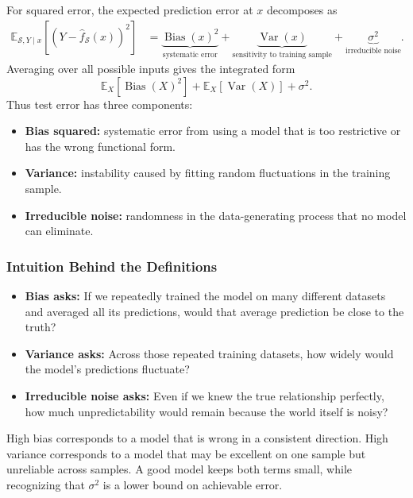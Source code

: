 \documentclass[12pt,openany]{book}
\begin{document}
For squared error, the expected prediction error at \(x\) decomposes as
\begin{equation*}
\begin{aligned}
    \mathbb{E}_{\mathcal{S},Y\mid x}\!\left[
        \left(Y-\hat{f}_{\mathcal{S}}(x)\right)^2
    \right]
    &=
    \underbrace{\operatorname{Bias}(x)^2}_{\text{systematic error}}
    +
    \underbrace{\operatorname{Var}(x)}_{\text{sensitivity to training sample}}
    +
    \underbrace{\sigma^2}_{\text{irreducible noise}}.
\end{aligned}
\end{equation*}
Averaging over all possible inputs gives the integrated form
\begin{equation*}
    \mathbb{E}_{X}\!\left[\operatorname{Bias}(X)^2\right]
    + \mathbb{E}_{X}\!\left[\operatorname{Var}(X)\right]
    + \sigma^2.
\end{equation*}
Thus test error has three components:
\begin{itemize}[leftmargin=*]
    \item \textbf{Bias squared:} systematic error from using a model that is too restrictive or has the wrong functional form.
    \item \textbf{Variance:} instability caused by fitting random fluctuations in the training sample.
    \item \textbf{Irreducible noise:} randomness in the data-generating process that no model can eliminate.
\end{itemize}

\subsubsection{Intuition Behind the Definitions}

\begin{itemize}[leftmargin=*]
    \item \textbf{Bias asks:} If we repeatedly trained the model on many different datasets and averaged all its predictions, would that average prediction be close to the truth?
    \item \textbf{Variance asks:} Across those repeated training datasets, how widely would the model's predictions fluctuate?
    \item \textbf{Irreducible noise asks:} Even if we knew the true relationship perfectly, how much unpredictability would remain because the world itself is noisy?
\end{itemize}

High bias corresponds to a model that is wrong in a consistent direction. High variance corresponds to a model that may be excellent on one sample but unreliable across samples. A good model keeps both terms small, while recognizing that \(\sigma^2\) is a lower bound on achievable error.
\end{document}
